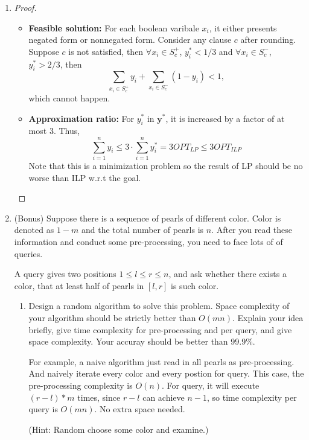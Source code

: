 \documentclass[12pt,a4paper]{article}
\makeatletter
\newtheorem*{solution}{Solution}
\theoremstyle{definition}
\renewenvironment{solution}[1][Solution] {\par\pushQED{\qed}\normalfont\topsep6\p@\@plus6\p@\relax\trivlist\item[\hskip\labelsep\bfseries#1\@addpunct{.}]\ignorespaces}{\popQED\endtrivlist\@endpefalse} \makeatother
\makeatother
\begin{document}
\begin{enumerate}
\begin{solution}
\begin{enumerate}
      \begin{proof}
        \begin{itemize}
          \item \textbf{Feasible solution:} For each boolean varibale $x_i$, it either presents negated form or nonnegated form. Consider any clause $c$ after rounding. Suppose $c$ is not satisfied, then $\forall x_i\in S_c^+$, $y_i^*<1/3$ and $\forall x_i\in S_c^-$, $y_i^*>2/3$, then 
          $$
          \sum_{x_i\in S_c^+}y_i+\sum_{x_i\in S_c^-}(1-y_i)< 1,
          $$
          which cannot happen.
          \item \textbf{Approximation ratio:} For $y_i^*$ in $\mathbf{y}^*$, it is increased by a factor of at most 3. Thus,
          $$
          \sum_{i=1}^ny_i\leq 3\cdot \sum_{i=1}^ny_i^*=3OPT_{LP}\leq3OPT_{ILP}
          $$
          Note that this is a minimization problem so the result of LP should be no worse than ILP w.r.t the goal.
        \end{itemize}
      \end{proof}
  \end{enumerate}
\end{solution}
\item
\color{red}(Bonus)\color{black} Suppose there is a sequence of pearls of different color. Color is denoted as $1-m$ and the total number of pearls is $n$. After you read these information and conduct some pre-processing, you need to face lots of of queries.\par
A query gives two positions $1\leq l\leq r \leq n$, and ask whether there exists a color, that at least half of pearls in $[l,r]$ is such color.\par

\begin{enumerate}
\item Design a random algorithm to solve this problem. Space complexity of your algorithm should be strictly better than $O(mn)$. Explain your idea briefly, give time complexity for pre-processing and per query, and give space complexity. Your accuray should be better than 99.9\%. \par
For example, a naive algorithm just read in all pearls as pre-processing. And naively iterate every color and every postion for query. This case, the pre-processing complexity is $O(n)$. For query, it will execute $(r-l)*m$ times, since $r-l$ can achieve $n-1$, so time complexity per query is $O(mn)$. No extra space needed.\par
\color{blue}(Hint: Random choose some color and examine.)\color{black}


\end{enumerate}
\end{enumerate}
\end{document}
